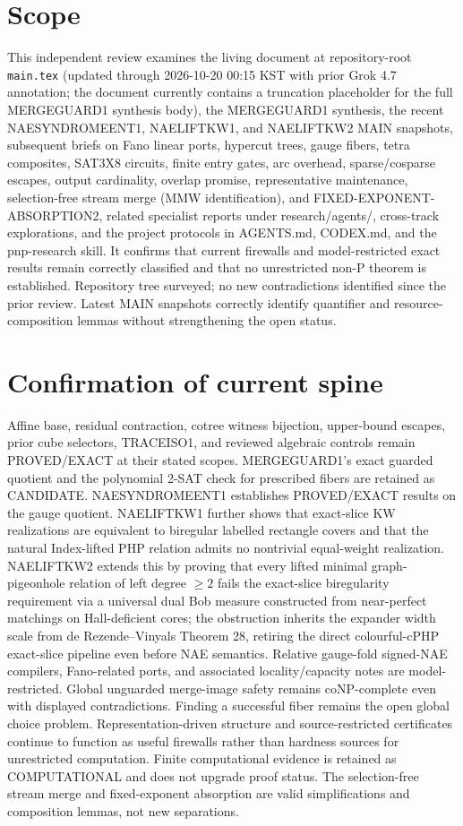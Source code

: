 \documentclass[11pt]{article}
\begin{document}
\section{Scope}
This independent review examines the living document at repository-root \texttt{main.tex} (updated through 2026-10-20 00:15 KST with prior Grok 4.7 annotation; the document currently contains a truncation placeholder for the full MERGEGUARD1 synthesis body), the MERGEGUARD1 synthesis, the recent NAESYNDROMEENT1, NAELIFTKW1, and NAELIFTKW2 MAIN snapshots, subsequent briefs on Fano linear ports, hypercut trees, gauge fibers, tetra composites, SAT3X8 circuits, finite entry gates, arc overhead, sparse/cosparse escapes, output cardinality, overlap promise, representative maintenance, selection-free stream merge (MMW identification), and FIXED-EXPONENT-ABSORPTION2, related specialist reports under research/agents/, cross-track explorations, and the project protocols in AGENTS.md, CODEX.md, and the pnp-research skill. It confirms that current firewalls and model-restricted exact results remain correctly classified and that no unrestricted non-P theorem is established. Repository tree surveyed; no new contradictions identified since the prior review. Latest MAIN snapshots correctly identify quantifier and resource-composition lemmas without strengthening the open status.

\section{Confirmation of current spine}
Affine base, residual contraction, cotree witness bijection, upper-bound escapes, prior cube selectors, TRACEISO1, and reviewed algebraic controls remain PROVED/EXACT at their stated scopes. MERGEGUARD1's exact guarded quotient and the polynomial 2-SAT check for prescribed fibers are retained as CANDIDATE. NAESYNDROMEENT1 establishes PROVED/EXACT results on the gauge quotient. NAELIFTKW1 further shows that exact-slice KW realizations are equivalent to biregular labelled rectangle covers and that the natural Index-lifted PHP relation admits no nontrivial equal-weight realization. NAELIFTKW2 extends this by proving that every lifted minimal graph-pigeonhole relation of left degree $\ge 2$ fails the exact-slice biregularity requirement via a universal dual Bob measure constructed from near-perfect matchings on Hall-deficient cores; the obstruction inherits the expander width scale from de Rezende--Vinyals Theorem 28, retiring the direct colourful-cPHP exact-slice pipeline even before NAE semantics. Relative gauge-fold signed-NAE compilers, Fano-related ports, and associated locality/capacity notes are model-restricted. Global unguarded merge-image safety remains coNP-complete even with displayed contradictions. Finding a successful fiber remains the open global choice problem. Representation-driven structure and source-restricted certificates continue to function as useful firewalls rather than hardness sources for unrestricted computation. Finite computational evidence is retained as COMPUTATIONAL and does not upgrade proof status. The selection-free stream merge and fixed-exponent absorption are valid simplifications and composition lemmas, not new separations.
\end{document}
